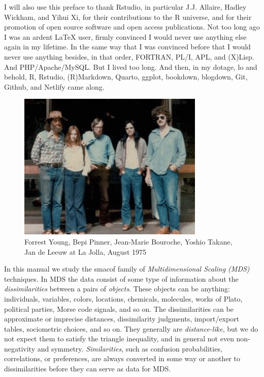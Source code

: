 \documentclass[
  12pt,
  letterpaper,
  DIV=11,
  numbers=noendperiod]{scrartcl}
\newcommand{\sectionbreak}{\clearpage}
\begin{document}
I will also use this preface to thank Rstudio, in particular J.J.
Allaire, Hadley Wickham, and Yihui Xi, for their contributions to the R
universe, and for their promotion of open source software and open
access publications. Not too long ago I was an ardent LaTeX user, firmly
convinced I would never use anything else again in my lifetime. In the
same way that I was convinced before that I would never use anything
besides, in that order, FORTRAN, PL/I, APL, and (X)Lisp. And
PHP/Apache/MySQL. But I lived too long. And then, in my dotage, lo and
behold, R, Rstudio, (R)Markdown, Quarto, ggplot, bookdown, blogdown,
Git, Github, and Netlify came along.

\begin{figure}[H]

{\centering \includegraphics[width=0.6\linewidth,height=\textheight,keepaspectratio]{graphics/lajolla_08_75.png}

}

\caption{Forrest Young, Bepi Pinner, Jean-Marie Bouroche, Yoshio Takane,
Jan de Leeuw at La Jolla, August 1975}

\end{figure}%

\sectionbreak

In this manual we study the smacof family of \emph{Multidimensional
Scaling (MDS)} techniques. In MDS the data consist of some type of
information about the \emph{dissimilarities} between a pairs of
\emph{objects}. These objects can be anything: individuals, variables,
colors, locations, chemicals, molecules, works of Plato, political
parties, Morse code signals, and so on. The dissimilarities can be
approximate or imprecise distances, dissimilarity judgments,
import/export tables, sociometric choices, and so on. They generally are
\emph{distance-like}, but we do not expect them to satisfy the triangle
inequality, and in general not even non-negativity and symmetry.
\emph{Similarities}, such as confusion probabilities, correlations, or
preferences, are always converted in some way or another to
dissimilarities before they can serve as data for MDS.
\end{document}

